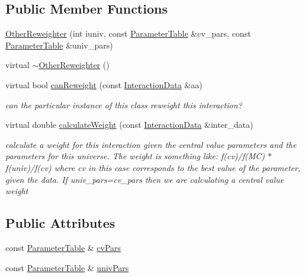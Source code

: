 \subsection*{Public Member Functions}
\begin{DoxyCompactItemize}
\item 
\hyperlink{class_neutrino_flux_reweight_1_1_other_reweighter_a79bde0ab15d0b12ae67910708a464892}{Other\-Reweighter} (int iuniv, const \hyperlink{class_neutrino_flux_reweight_1_1_parameter_table}{Parameter\-Table} \&cv\-\_\-pars, const \hyperlink{class_neutrino_flux_reweight_1_1_parameter_table}{Parameter\-Table} \&univ\-\_\-pars)
\item 
virtual \hyperlink{class_neutrino_flux_reweight_1_1_other_reweighter_a001941f2120ae5832bb2086077038667}{$\sim$\-Other\-Reweighter} ()
\item 
virtual bool \hyperlink{class_neutrino_flux_reweight_1_1_other_reweighter_af5cadc4dcde8b9884962399b0a29bc5a}{can\-Reweight} (const \hyperlink{class_neutrino_flux_reweight_1_1_interaction_data}{Interaction\-Data} \&aa)
\begin{DoxyCompactList}\small\item\em can the particular instance of this class reweight this interaction? \end{DoxyCompactList}\item 
virtual double \hyperlink{class_neutrino_flux_reweight_1_1_other_reweighter_aca4a447053eede66a97747c98a2d89a2}{calculate\-Weight} (const \hyperlink{class_neutrino_flux_reweight_1_1_interaction_data}{Interaction\-Data} \&inter\-\_\-data)
\begin{DoxyCompactList}\small\item\em calculate a weight for this interaction given the central value parameters and the parameters for this universe. The weight is something like\-: f(cv)/f(M\-C) $\ast$ f(univ)/f(cv) where cv in this case corresponds to the best value of the parameter, given the data. If univ\-\_\-pars=cv\-\_\-pars then we are calculating a central value weight \end{DoxyCompactList}\end{DoxyCompactItemize}
\subsection*{Public Attributes}
\begin{DoxyCompactItemize}
\item 
const \hyperlink{class_neutrino_flux_reweight_1_1_parameter_table}{Parameter\-Table} \& \hyperlink{class_neutrino_flux_reweight_1_1_other_reweighter_a8dd49509293e302c005023668d153011}{cv\-Pars}
\item 
const \hyperlink{class_neutrino_flux_reweight_1_1_parameter_table}{Parameter\-Table} \& \hyperlink{class_neutrino_flux_reweight_1_1_other_reweighter_a2795ccb32eccdca967070a4768b9ca27}{univ\-Pars}
\end{DoxyCompactItemize}
